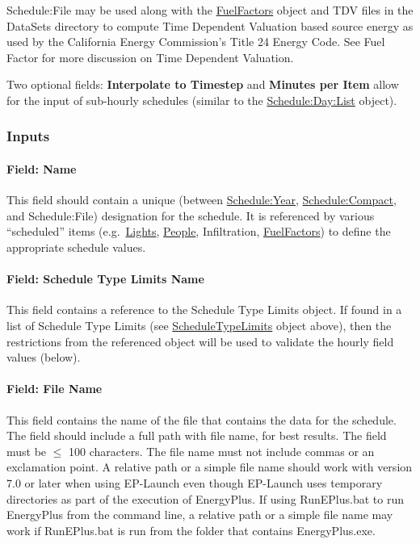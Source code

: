 Schedule:File may be used along with the \hyperref[fuelfactors]{FuelFactors} object and TDV files in the DataSets directory to compute Time Dependent Valuation based source energy as used by the California Energy Commission's Title 24 Energy Code. See Fuel Factor for more discussion on Time Dependent Valuation.

Two optional fields: \textbf{Interpolate to Timestep} and \textbf{Minutes per Item} allow for the input of sub-hourly schedules (similar to the \hyperref[scheduledaylist]{Schedule:Day:List} object).

\subsubsection{Inputs}\label{inputs-9-019}

\paragraph{Field: Name}\label{field-name-8-018}

This field should contain a unique (between \hyperref[scheduleyear]{Schedule:Year}, \hyperref[schedulecompact]{Schedule:Compact}, and Schedule:File) designation for the schedule. It is referenced by various ``scheduled'' items (e.g.~\hyperref[lights-000]{Lights}, \hyperref[people]{People}, Infiltration, \hyperref[fuelfactors]{FuelFactors}) to define the appropriate schedule values.

\paragraph{Field: Schedule Type Limits Name}\label{field-schedule-type-limits-name-6}

This field contains a reference to the Schedule Type Limits object. If found in a list of Schedule Type Limits (see \hyperref[scheduletypelimits]{ScheduleTypeLimits} object above), then the restrictions from the referenced object will be used to validate the hourly field values (below).

\paragraph{Field: File Name}\label{schedulefile-field-file-name}

This field contains the name of the file that contains the data for the schedule. The field should include a full path with file name, for best results. The field must be \(\le\) 100 characters. The file name must not include commas or an exclamation point. A relative path or a simple file name should work with version 7.0 or later when using EP-Launch even though EP-Launch uses temporary directories as part of the execution of EnergyPlus. If using RunEPlus.bat to run EnergyPlus from the command line, a relative path or a simple file name may work if RunEPlus.bat is run from the folder that contains EnergyPlus.exe.

